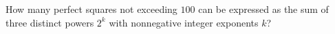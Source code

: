 How many perfect squares not exceeding $100$ can be expressed as the sum of three distinct powers $2^k$ with nonnegative integer exponents $k$?
